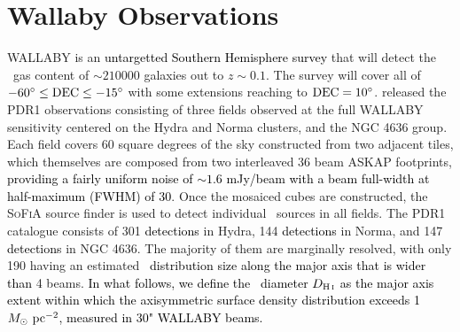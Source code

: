 \documentclass[fleqn,usenatbib]{mnras}
\newcommand{\hi}{\text{H\,\sc{i}}}
\newcommand{\KS}[1]{\textcolor{black}{#1}}
\begin{document}
\section{Wallaby Observations} \label{Sec:WALLABY}

WALLABY \citep{Koribalski2020} is an \textcolor{black}{untargetted Southern Hemisphere survey} that will detect the \hi\ gas content of $\sim 210000$ galaxies \citep{SoFiARelease} out to $z\sim0.1$. The survey will cover all of $-60^{\circ} \le  \rm{DEC} \le -15 ^{\circ}$ with some extensions reaching to $\rm{DEC} = 10^{\circ}$.  \citet{SoFiARelease} released the PDR1 observations consisting of three fields observed at the full WALLABY sensitivity centered on the Hydra and Norma clusters, and the NGC 4636 group. Each field covers 60 square degrees of the sky constructed from two adjacent tiles, which themselves are composed from two interleaved 36 beam ASKAP footprints, \textcolor{black}{providing a fairly uniform noise of $\sim1.6$ mJy/beam with a beam full-width at half-maximum (FWHM) of 30\arcsec}.  
Once the mosaiced cubes are constructed, the \textsc{SoFiA} source finder \citep{Serra2015,Westmeier2021} is used to detect individual \hi\ sources in all fields.  The PDR1 catalogue consists of 301 \textcolor{black}{detections} in Hydra, 144 \textcolor{black}{detections} in Norma, and 147 \textcolor{black}{detections} in NGC 4636.  The majority of them are marginally resolved, with only 190 having an estimated \textcolor{black}{\hi\ distribution size along the major axis that is wider than} 4 beams. \KS{In what follows, we define the \hi\ diameter $D_{\hi}$ as the major axis extent within which the axisymmetric surface density distribution exceeds 1 $M_{\odot}~\rm{pc}^{-2}$, measured in 30" WALLABY beams.} 
\end{document}
